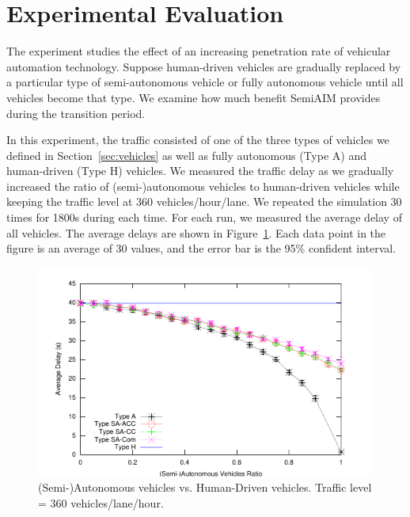 \section{Experimental Evaluation}
\label{sec:simulation}

The experiment studies the effect of an increasing penetration rate
of vehicular automation technology.  Suppose human-driven vehicles are
gradually replaced by a particular type of semi-autonomous vehicle or
fully autonomous vehicle until all vehicles become that type.  We examine how
much benefit SemiAIM provides during the transition period.

In this experiment, the traffic consisted of one of the three types of
vehicles we defined in Section~\ref{sec:vehicles} as well as fully
autonomous (Type A) and human-driven (Type H) vehicles.  We measured
the traffic delay as we gradually increased the ratio of
\mbox{(semi-)autonomous} vehicles to human-driven vehicles while
keeping the traffic level at 360 vehicles/hour/lane.  We repeated the
simulation 30 times for 1800s during each time.  For each run, we
measured the average delay of all vehicles.  The average delays are
shown in Figure~\ref{fig:two360}.  Each data point in the figure is an
average of 30 values, and the error bar is the 95\% confident interval.

 
\begin{figure}
\centering
\includegraphics[width=0.9\columnwidth]{figures/figure_1.pdf}
\vspace{-.07in}
\caption{(Semi-)Autonomous vehicles vs. Human-Driven vehicles. Traffic
level = 360 vehicles/lane/hour.}
\label{fig:two360}
\vspace{-.1in}
\end{figure}

